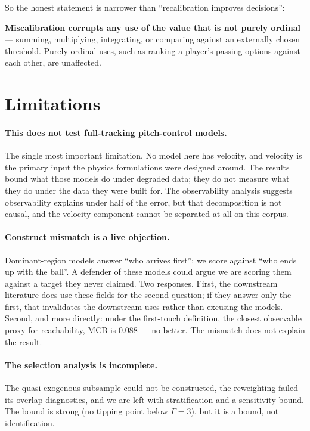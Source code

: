 \documentclass[11pt,a4paper]{article}
\begin{document}
So the honest statement is narrower than ``recalibration improves decisions'':

\begin{plainbox}
\small
\textbf{Miscalibration corrupts any use of the value that is not purely
ordinal} --- summing, multiplying, integrating, or comparing against an
externally chosen threshold. Purely ordinal uses, such as ranking a player's
passing options against each other, are unaffected.
\end{plainbox}

\section{Limitations}
\label{sec:limits}

\paragraph{This does not test full-tracking pitch-control models.}
The single most important limitation. No model here has velocity, and velocity is
the primary input the physics formulations were designed around. The results
bound what those models do under degraded data; they do not measure what they do
under the data they were built for. The observability analysis suggests
observability explains under half of the error, but that decomposition is not
causal, and the velocity component cannot be separated at all on this corpus.

\paragraph{Construct mismatch is a live objection.}
Dominant-region models answer ``who arrives first''; we score against ``who ends
up with the ball''. A defender of these models could argue we are scoring them
against a target they never claimed. Two responses. First, the downstream
literature does use these fields for the second question; if they answer only the
first, that invalidates the downstream uses rather than excusing the models.
Second, and more directly: under the first-touch definition, the closest
observable proxy for reachability, MCB is 0.088 --- no better. The mismatch does
not explain the result.

\paragraph{The selection analysis is incomplete.}
The quasi-exogenous subsample could not be constructed, the reweighting failed
its overlap diagnostics, and we are left with stratification and a sensitivity
bound. The bound is strong (no tipping point below $\Gamma = 3$), but it is a
bound, not identification.
\end{document}
